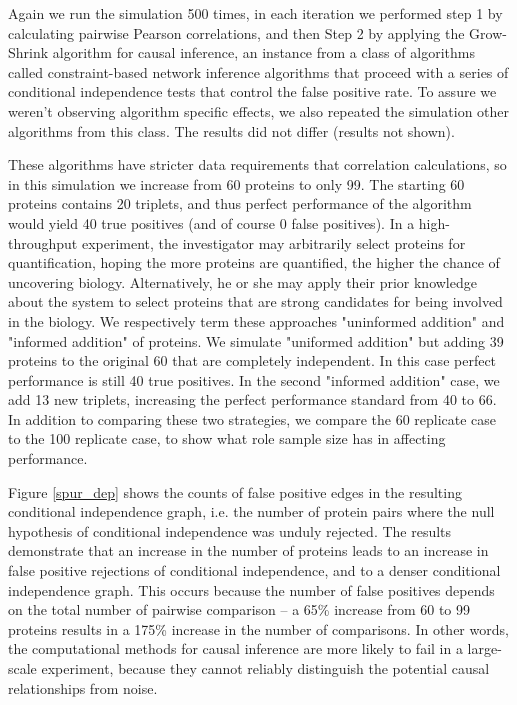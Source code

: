 \documentclass[journal=jacsat,manuscript=article]{achemso}
\def\added#1{{\color{blue} #1}}
\begin{document}
\added{Again we run the simulation 500 times, in each iteration we performed step 1 by calculating pairwise Pearson correlations, and then Step 2 by applying the Grow-Shrink algorithm \cite{margaritis2003learning} for causal inference, an instance from a class of algorithms called constraint-based network inference algorithms\cite{spirtes2000causation} that proceed with a series of conditional independence tests that control the false positive rate.  To assure we weren't observing algorithm specific effects, we also repeated the simulation other algorithms from this class\cite{tsamardinos2003algorithms}\cite{yaramakala2005speculative}.  The results did not differ (results not shown).}  

\added{These algorithms have stricter data requirements that correlation calculations, so in this simulation we increase from 60 proteins to only 99.  The starting 60 proteins contains 20 triplets, and thus perfect performance of the algorithm would yield 40 true positives (and of course 0 false positives).  In a high-throughput experiment, the investigator may arbitrarily select proteins for quantification, hoping the more proteins are quantified, the higher the chance of uncovering biology.  Alternatively, he or she may apply their prior knowledge about the system to select proteins that are strong candidates for being involved in the biology.  We respectively term these approaches "uninformed addition" and "informed addition" of proteins.  We simulate "uniformed addition" but adding 39 proteins to the original 60 that are completely independent.  In this case perfect performance is still 40 true positives.  In the second "informed addition" case, we add 13 new triplets, increasing the perfect performance standard from 40 to 66.  In addition to comparing these two strategies, we compare the 60 replicate case to the 100 replicate case, to show what role sample size has in affecting performance.}

Figure \ref{spur_dep} shows the counts of false positive edges in the resulting conditional independence graph, i.e. the number of protein pairs \added{where the null hypothesis of conditional independence was unduly rejected}.  The results demonstrate that an increase in the number of proteins leads to an increase in false positive rejections of conditional independence, and to a denser conditional independence graph.  \added{This occurs because the number of false positives depends on the total number of pairwise comparison -- a 65\% increase from 60 to 99 proteins results in a 175\% increase in the number of comparisons.  In other words, the computational methods for causal inference are more likely to fail in a large-scale experiment, because they cannot reliably distinguish the potential causal relationships from noise.}
\end{document}

